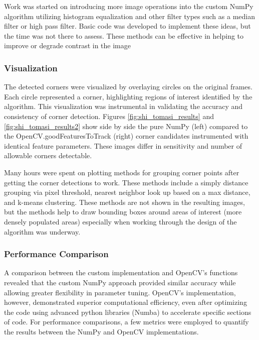 \documentclass[11pt, conference, letterpaper]{IEEEtran}
\begin{document}
Work was started on introducing more image operations into the custom NumPy algorithm utilizing histogram equalization and other filter types such as a median filter or high pass filter. Basic code was developed to implement these ideas, but the time was not there to assess. These methods can be effective in helping to improve or degrade contrast in the image
\bigskip

\subsubsection{Visualization}
The detected corners were visualized by overlaying circles on the original frames. Each circle represented a corner, highlighting regions of interest identified by the algorithm. This visualization was instrumental in validating the accuracy and consistency of corner detection. Figures \ref{fig:shi_tomasi_results} and \ref{fig:shi_tomasi_results2} show side by side the pure NumPy (left) compared to the OpenCV.goodFeaturesToTrack (right) corner candidates instrumented with identical feature parameters. These images differ in sensitivity and number of allowable corners detectable.

Many hours were spent on plotting methods for grouping corner points after getting the corner detections to work. These methods include a simply distance grouping via pixel threshold, nearest neighbor look up based on a max distance, and k-means clustering. These methods are not shown in the resulting images, but the methods help to draw bounding boxes around areas of interest (more densely populated areas) especially when working through the design of the algorithm was underway.
\bigskip

\subsubsection{Performance Comparison}
A comparison between the custom implementation and OpenCV's functions revealed that the custom NumPy approach provided similar accuracy while allowing greater flexibility in parameter tuning. OpenCV's implementation, however, demonstrated superior computational efficiency, even after optimizing the code using advanced python libraries (Numba) to accelerate specific sections of code. For performance comparisons, a few metrics were employed to quantify the results between the NumPy and OpenCV implementations.
\end{document}
